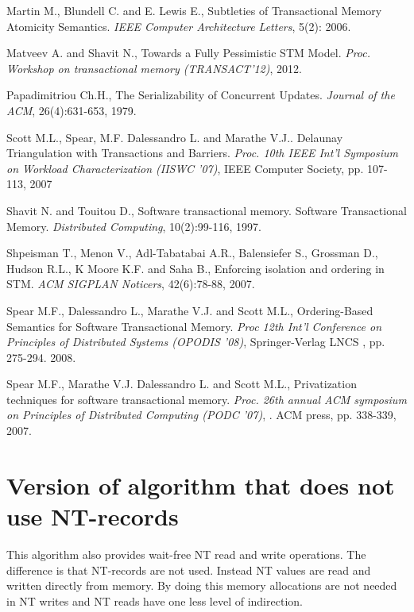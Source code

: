 \documentclass[11pt,letterpaper]{article}
\begin{document}
{\begin{thebibliography}{guerraoui08}
 Martin M.,  Blundell C.  and E. Lewis E.,
 Subtleties of Transactional Memory Atomicity Semantics. 
{\it IEEE Computer Architecture  Letters},  5(2):  2006.


Matveev A. and  Shavit N.,
Towards a Fully Pessimistic STM Model. 
{\it Proc. Workshop on transactional memory (TRANSACT'12)}, 2012.



Papadimitriou Ch.H., 
The Serializability of Concurrent Updates. 
{\it Journal of the ACM},  26(4):631-653, 1979. 


 Scott M.L.,  Spear, M.F. Dalessandro L.  and  Marathe V.J..
 Delaunay Triangulation with Transactions and Barriers. 
{\it Proc.  10th IEEE Int'l Symposium on Workload Characterization (IISWC '07)},
 IEEE Computer Society, pp. 107-113, 2007





 Shavit N. and  Touitou D.,
 Software transactional memory. 
Software Transactional Memory. 
{\it Distributed  Computing}, 10(2):99-116, 1997. 


 Shpeisman T.,  Menon V.,  Adl-Tabatabai A.R.,  Balensiefer  S.,  Grossman D.,
 Hudson R.L., K Moore K.F.  and  Saha B., 
Enforcing isolation and ordering in STM. 
{\it ACM  SIGPLAN Noticers}, 42(6):78-88,  2007.





Spear M.F.,  Dalessandro L.,  Marathe V.J. and  Scott M.L., 
Ordering-Based Semantics for Software Transactional Memory. 
{\it Proc  12th Int'l Conference on Principles of Distributed Systems 
(OPODIS '08)},  Springer-Verlag LNCS , pp. 275-294. 2008. 



Spear M.F.,  Marathe V.J. Dalessandro L. and  Scott M.L., 
Privatization techniques for software transactional memory. 
{\it Proc. 26th  annual ACM symposium on Principles of Distributed Computing 
(PODC '07)}, . ACM press, pp.  338-339, 2007.



\end{thebibliography}

}

\appendix
\section{Version of algorithm that does not use NT-records}
This algorithm also provides wait-free NT read and write operations.
The difference is that NT-records are not used.
Instead NT values are read and written directly from memory.
By doing this memory allocations are not needed in NT writes and NT reads have
one less level of indirection.
\end{document}
